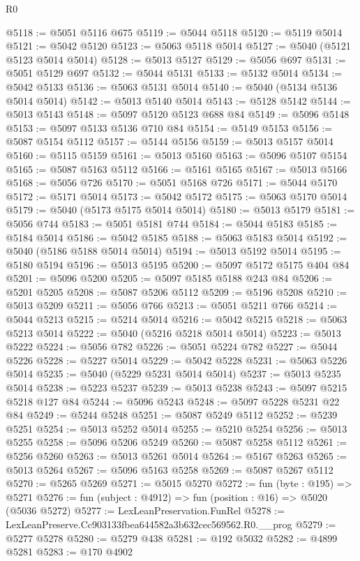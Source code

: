 \begin{lexlean}{R0}
\begin{coremodule}
@5118 := @5051 @5116 @675
@5119 := @5044 @5118
@5120 := @5119 @5014
@5121 := @5042 @5120
@5123 := @5063 @5118 @5014
@5127 := @5040 (@5121 @5123 @5014 @5014)
@5128 := @5013 @5127
@5129 := @5056 @697
@5131 := @5051 @5129 @697
@5132 := @5044 @5131
@5133 := @5132 @5014
@5134 := @5042 @5133
@5136 := @5063 @5131 @5014
@5140 := @5040 (@5134 @5136 @5014 @5014)
@5142 := @5013 @5140 @5014
@5143 := @5128 @5142
@5144 := @5013 @5143
@5148 := @5097 @5120 @5123 @688 @84
@5149 := @5096 @5148
@5153 := @5097 @5133 @5136 @710 @84
@5154 := @5149 @5153
@5156 := @5087 @5154 @5112
@5157 := @5144 @5156
@5159 := @5013 @5157 @5014
@5160 := @5115 @5159
@5161 := @5013 @5160
@5163 := @5096 @5107 @5154
@5165 := @5087 @5163 @5112
@5166 := @5161 @5165
@5167 := @5013 @5166
@5168 := @5056 @726
@5170 := @5051 @5168 @726
@5171 := @5044 @5170
@5172 := @5171 @5014
@5173 := @5042 @5172
@5175 := @5063 @5170 @5014
@5179 := @5040 (@5173 @5175 @5014 @5014)
@5180 := @5013 @5179
@5181 := @5056 @744
@5183 := @5051 @5181 @744
@5184 := @5044 @5183
@5185 := @5184 @5014
@5186 := @5042 @5185
@5188 := @5063 @5183 @5014
@5192 := @5040 (@5186 @5188 @5014 @5014)
@5194 := @5013 @5192 @5014
@5195 := @5180 @5194
@5196 := @5013 @5195
@5200 := @5097 @5172 @5175 @404 @84
@5201 := @5096 @5200
@5205 := @5097 @5185 @5188 @243 @84
@5206 := @5201 @5205
@5208 := @5087 @5206 @5112
@5209 := @5196 @5208
@5210 := @5013 @5209
@5211 := @5056 @766
@5213 := @5051 @5211 @766
@5214 := @5044 @5213
@5215 := @5214 @5014
@5216 := @5042 @5215
@5218 := @5063 @5213 @5014
@5222 := @5040 (@5216 @5218 @5014 @5014)
@5223 := @5013 @5222
@5224 := @5056 @782
@5226 := @5051 @5224 @782
@5227 := @5044 @5226
@5228 := @5227 @5014
@5229 := @5042 @5228
@5231 := @5063 @5226 @5014
@5235 := @5040 (@5229 @5231 @5014 @5014)
@5237 := @5013 @5235 @5014
@5238 := @5223 @5237
@5239 := @5013 @5238
@5243 := @5097 @5215 @5218 @127 @84
@5244 := @5096 @5243
@5248 := @5097 @5228 @5231 @22 @84
@5249 := @5244 @5248
@5251 := @5087 @5249 @5112
@5252 := @5239 @5251
@5254 := @5013 @5252 @5014
@5255 := @5210 @5254
@5256 := @5013 @5255
@5258 := @5096 @5206 @5249
@5260 := @5087 @5258 @5112
@5261 := @5256 @5260
@5263 := @5013 @5261 @5014
@5264 := @5167 @5263
@5265 := @5013 @5264
@5267 := @5096 @5163 @5258
@5269 := @5087 @5267 @5112
@5270 := @5265 @5269
@5271 := @5015 @5270
@5272 := fun (byte : @195) => @5271
@5276 := fun (subject : @4912) => fun (position : @16) => @5020 (@5036 @5272)
@5277 := LexLeanPreservation.FunRel
@5278 := LexLeanPreserve.Cc903133fbea644582a3b632cec569562.R0.__prog
@5279 := @5277 @5278
@5280 := @5279 @438
@5281 := @192 @5032
@5282 := @4899 @5281
@5283 := @170 @4902

\end{coremodule}
\end{lexlean}
